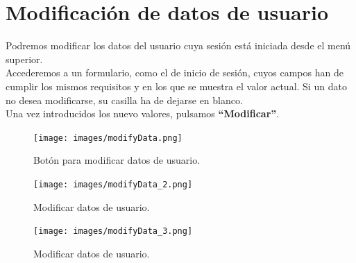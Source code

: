 \documentclass[12pt, twoside]{report}
\begin{document}
\section*{Modificación de datos de usuario}
\noindent Podremos modificar los datos del usuario cuya sesión está iniciada desde el menú superior.\\
Accederemos a un formulario, como el de inicio de sesión, cuyos campos han de cumplir los mismos requisitos y en los que se muestra el valor actual. Si un dato no desea modificarse, su casilla ha de dejarse en blanco.\\
Una vez introducidos los nuevo valores, pulsamos \textbf{``Modificar''}.\\
\begin{figure}[h]
\begin{center}
\texttt{[image: images/modifyData.png]}
\end{center}
\caption{\label{inicio} Botón para modificar datos de usuario.}
\end{figure}
\begin{figure}[h]
\begin{center}
\texttt{[image: images/modifyData\_2.png]}
\end{center}
\caption{\label{inicio} Modificar datos de usuario.}
\end{figure}
\begin{figure}[h]
\begin{center}
\texttt{[image: images/modifyData\_3.png]}
\end{center}
\caption{\label{inicio} Modificar datos de usuario.}
\end{figure}
\clearpage
\end{document}
